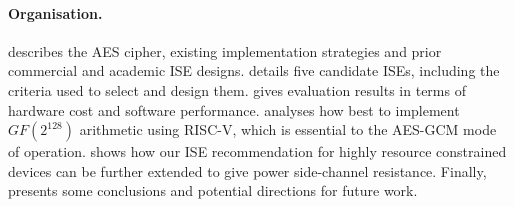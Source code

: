 
\paragraph{Organisation.}


 describes the AES cipher, existing implementation strategies
and prior commercial and academic ISE designs.
 details five candidate ISEs, including the criteria
used to select and design them.
 gives evaluation results in terms of hardware cost
and software performance.
 analyses how best to implement $GF(2^{128})$ arithmetic
using RISC-V, which is essential to the AES-GCM mode of operation.
 shows how our ISE recommendation for highly resource
constrained devices can be further extended to give power side-channel
resistance.
Finally, 
presents some conclusions and potential directions for future work.

%

